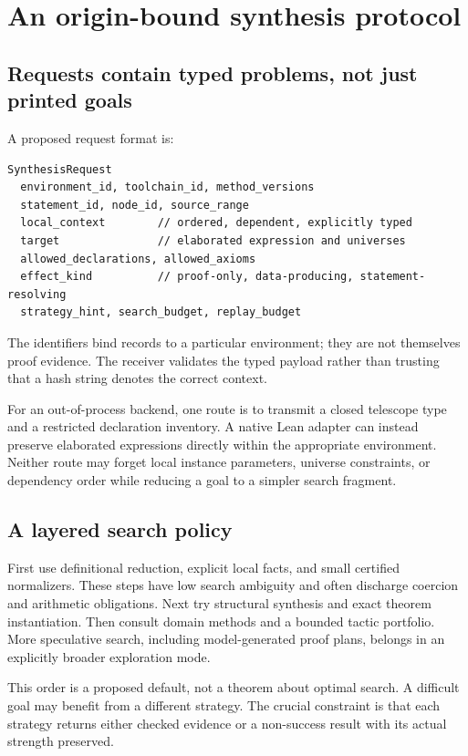\documentclass[11pt,a4paper]{article}
\theoremstyle{remark}
\begin{document}
\section{An origin-bound synthesis protocol}
\label{sec:protocol}

\subsection{Requests contain typed problems, not just printed goals}

A proposed request format is:
\begin{lstlisting}[caption={Conceptual protocol fields; this is not a current Leant API.}]
SynthesisRequest
  environment_id, toolchain_id, method_versions
  statement_id, node_id, source_range
  local_context        // ordered, dependent, explicitly typed
  target               // elaborated expression and universes
  allowed_declarations, allowed_axioms
  effect_kind          // proof-only, data-producing, statement-resolving
  strategy_hint, search_budget, replay_budget
\end{lstlisting}
The identifiers bind records to a particular environment; they are not themselves proof evidence. The receiver validates the typed payload rather than trusting that a hash string denotes the correct context.

For an out-of-process backend, one route is to transmit a closed telescope type and a restricted declaration inventory. A native Lean adapter can instead preserve elaborated expressions directly within the appropriate environment. Neither route may forget local instance parameters, universe constraints, or dependency order while reducing a goal to a simpler search fragment.

\subsection{A layered search policy}

First use definitional reduction, explicit local facts, and small certified normalizers. These steps have low search ambiguity and often discharge coercion and arithmetic obligations. Next try structural synthesis and exact theorem instantiation. Then consult domain methods and a bounded tactic portfolio. More speculative search, including model-generated proof plans, belongs in an explicitly broader exploration mode.

This order is a proposed default, not a theorem about optimal search. A difficult goal may benefit from a different strategy. The crucial constraint is that each strategy returns either checked evidence or a non-success result with its actual strength preserved.
\end{document}
